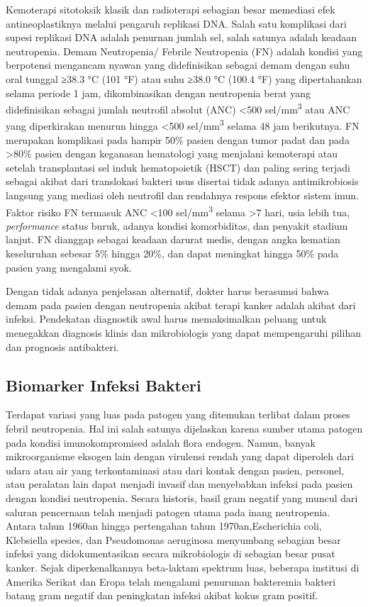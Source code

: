 \documentclass[
  10pt,
  letterpaper,
]{article}
\begin{document}
Kemoterapi sitotoksik klasik dan radioterapi sebagian besar memediasi
efek antineoplastiknya melalui pengaruh replikasi DNA. Salah satu
komplikasi dari supesi replikasi DNA adalah penurnan jumlah sel, salah
satunya adalah keadaan neutropenia. Demam Neutropenia/ Febrile
Neutropenia (FN) adalah kondisi yang berpotensi mengancam nyawan yang
didefinisikan sebagai demam dengan suhu oral tunggal ≥38.3 °C (101 °F)
atau suhu ≥38.0 °C (100.4 °F) yang dipertahankan selama periode 1 jam,
dikombinasikan dengan neutropenia berat yang didefinisikan sebagai
jumlah neutrofil absolut (ANC) \textless500 sel/mm\textsuperscript{3}
atau ANC yang diperkirakan menurun hingga \textless500
sel/mm\textsuperscript{3} selama 48 jam berikutnya.\citep{Zimmer2019} FN
merupakan komplikasi pada hampir 50\% pasien dengan tumor padat dan pada
\textgreater80\% pasien dengan keganasan hematologi yang menjalani
kemoterapi atau setelah transplantasi sel induk hematopoietik (HSCT) dan
paling sering terjadi sebagai akibat dari translokasi bakteri usus
disertai tidak adanya antimikrobiosis langsung yang mediasi oleh
neutrofil dan rendahnya respons efektor sistem imun. Faktor risiko FN
termasuk ANC \textless100 sel/mm\textsuperscript{3} selama \textgreater7
hari, usia lebih tua, \emph{performance} status buruk, adanya kondisi
komorbiditas, dan penyakit stadium lanjut.\citep{baluch2019infections}
FN dianggap sebagai keadaan darurat medis, dengan angka kematian
keseluruhan sebesar 5\% hingga 20\%, dan dapat meningkat hingga 50\%
pada pasien yang mengalami syok.\citep{carmona-bayonas2015}

Dengan tidak adanya penjelasan alternatif, dokter harus berasumsi bahwa
demam pada pasien dengan neutropenia akibat terapi kanker adalah akibat
dari infeksi. Pendekatan diagnostik awal harus memaksimalkan peluang
untuk menegakkan diagnosis klinis dan mikrobiologis yang dapat
mempengaruhi pilihan dan prognosis antibakteri.\citep{taplitz2018}

\subsection{Biomarker Infeksi Bakteri}\label{biomarker-infeksi-bakteri}

Terdapat variasi yang luas pada patogen yang ditemukan terlibat dalam
proses febril neutropenia. Hal ini salah satunya dijelaskan karena
sumber utama patogen pada kondisi imunokompromised adalah flora endogen.
Namun, banyak mikroorganisme eksogen lain dengan virulensi rendah yang
dapat diperoleh dari udara atau air yang terkontaminasi atau dari kontak
dengan pasien, personel, atau peralatan lain dapat menjadi invasif dan
menyebabkan infeksi pada pasien dengan kondisi neutropenia. Secara
historis, basil gram negatif yang muncul dari saluran pencernaan telah
menjadi patogen utama pada inang neutropenia. Antara tahun 1960an hingga
pertengahan tahun 1970an,Escherichia coli, Klebsiella spesies, dan
Pseudomonas aeruginosa menyumbang sebagian besar infeksi yang
didokumentasikan secara mikrobiologis di sebagian besar pusat kanker.
Sejak diperkenalkannya beta-laktam spektrum luas, beberapa institusi di
Amerika Serikat dan Eropa telah mengalami penurunan bakteremia bakteri
batang gram negatif dan peningkatan infeksi akibat kokus gram
positif.\citep{sipsas}
\end{document}
